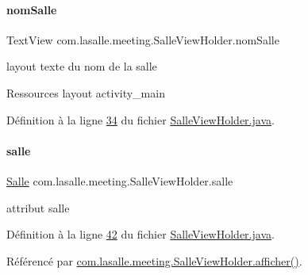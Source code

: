 \mbox{\label{classcom_1_1lasalle_1_1meeting_1_1_salle_view_holder_a54d26a89113e63e36c17c4ed9253f058}} 
\paragraph{\texorpdfstring{nom\+Salle}{nomSalle}}
{\footnotesize\ttfamily Text\+View com.\+lasalle.\+meeting.\+Salle\+View\+Holder.\+nom\+Salle\hspace{0.3cm}{\ttfamily [private]}}



layout texte du nom de la salle 

Ressources layout activity\+\_\+main 

Définition à la ligne \hyperlink{_salle_view_holder_8java_source_l00034}{34} du fichier \hyperlink{_salle_view_holder_8java_source}{Salle\+View\+Holder.\+java}.

\mbox{\label{classcom_1_1lasalle_1_1meeting_1_1_salle_view_holder_afe85265c9d35c5035e96ace9c8032606}} 
\paragraph{\texorpdfstring{salle}{salle}}
{\footnotesize\ttfamily \hyperlink{classcom_1_1lasalle_1_1meeting_1_1_salle}{Salle} com.\+lasalle.\+meeting.\+Salle\+View\+Holder.\+salle\hspace{0.3cm}{\ttfamily [private]}}



attribut salle 



Définition à la ligne \hyperlink{_salle_view_holder_8java_source_l00042}{42} du fichier \hyperlink{_salle_view_holder_8java_source}{Salle\+View\+Holder.\+java}.



Référencé par \hyperlink{_salle_view_holder_8java_source_l00077}{com.\+lasalle.\+meeting.\+Salle\+View\+Holder.\+afficher()}.

